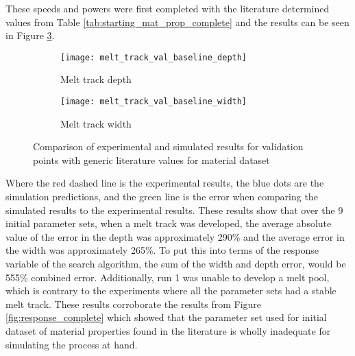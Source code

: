These speeds and powers were first completed with the literature determined values from Table \ref{tab:starting_mat_prop_complete} and the results can be seen in Figure \ref{fig:melt_track_val_baseline}.
\begin{figure}[!htb]\centering
	\begin{subfigure}[c]{0.45\textwidth}\centering
	\texttt{[image: melt\_track\_val\_baseline\_depth]}
	\caption{Melt track depth}
	\label{fig:melt_track_val_baseline_depth}
	\end{subfigure}\hfill{}
		\begin{subfigure}[c]{0.45\textwidth}\centering
		\texttt{[image: melt\_track\_val\_baseline\_width]}
		\caption{Melt track width}
		\label{fig:melt_track_val_baseline_width}
		\end{subfigure}
	\caption{Comparison of experimental and simulated results for validation points with generic literature values for  material dataset}
	\label{fig:melt_track_val_baseline}
\end{figure}
Where the red dashed line is the experimental results, the blue dots are the simulation predictions, and the green line is the error when comparing the simulated results to the experimental results.
These results show that over the 9 initial parameter sets, when a melt track was developed, the average absolute value of the error in the depth was approximately 290\% and the average error in the width was approximately 265\%.  To put this into terms of the response variable of the search algorithm, the sum of the width and depth error, would be 555\% combined error.
Additionally, run 1 was unable to develop a melt pool, which is contrary to the experiments where all the parameter sets had a stable melt track.  These results corroborate the results from Figure \ref{fig:response_complete} which showed that the parameter set used for  initial dataset of material properties found in the literature is wholly inadequate for simulating the process at hand. 

